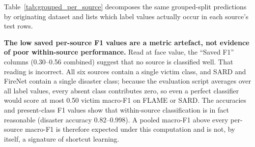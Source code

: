 Table~\ref{tab:grouped_per_source} decomposes the same grouped-split predictions by originating dataset and lists which label values actually occur in each source's test rows.

\begin{table}[H]
\centering
\caption[Grouped-split results by source dataset]{Grouped-split results by source dataset (AdapFuse-v1, $n=11{,}097$). Saved F1 averages over all classes, so classes absent from a source score zero; Present-class F1 averages only the classes present.}
\label{tab:grouped_per_source}
\end{table}

\textbf{The low saved per-source F1 values are a metric artefact, not evidence of poor within-source performance.} Read at face value, the ``Saved F1'' columns (0.30--0.56 combined) suggest that no source is classified well. That reading is incorrect. All six sources contain a single victim class, and SARD and FireNet contain a single disaster class; because the evaluation script averages over all label values, every absent class contributes zero, so even a perfect classifier would score at most 0.50 victim macro-F1 on FLAME or SARD. The accuracies and present-class F1 values show that within-source classification is in fact reasonable (disaster accuracy 0.82--0.998). A pooled macro-F1 above every per-source macro-F1 is therefore expected under this computation and is not, by itself, a signature of shortcut learning.

